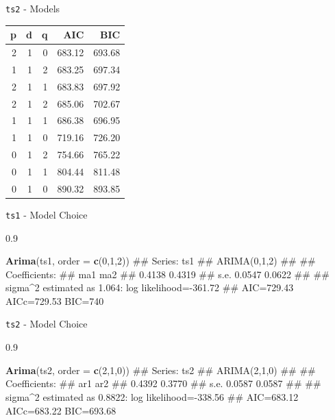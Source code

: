 \documentclass[11pt,ignorenonframetext,]{beamer}
\newenvironment{Shaded}{}{}
\newcommand{\KeywordTok}[1]{\textcolor[rgb]{0.00,0.44,0.13}{\textbf{#1}}}
\newcommand{\DataTypeTok}[1]{\textcolor[rgb]{0.56,0.13,0.00}{#1}}
\newcommand{\DecValTok}[1]{\textcolor[rgb]{0.25,0.63,0.44}{#1}}
\newcommand{\NormalTok}[1]{#1}
\let\oldShaded\Shaded
\let\endoldShaded\endShaded
\renewenvironment{Shaded}{\footnotesize\begin{spacing}{0.9}\oldShaded}{\endoldShaded\end{spacing}}
\begin{document}
\begin{frame}{\texttt{ts2} - Models}

\begin{longtable}[]{@{}rrrrr@{}}
\toprule
p & d & q & AIC & BIC\tabularnewline
\midrule
\endhead
2 & 1 & 0 & 683.12 & 693.68\tabularnewline
1 & 1 & 2 & 683.25 & 697.34\tabularnewline
2 & 1 & 1 & 683.83 & 697.92\tabularnewline
2 & 1 & 2 & 685.06 & 702.67\tabularnewline
1 & 1 & 1 & 686.38 & 696.95\tabularnewline
1 & 1 & 0 & 719.16 & 726.20\tabularnewline
0 & 1 & 2 & 754.66 & 765.22\tabularnewline
0 & 1 & 1 & 804.44 & 811.48\tabularnewline
0 & 1 & 0 & 890.32 & 893.85\tabularnewline
\bottomrule
\end{longtable}

\end{frame}

\begin{frame}[fragile,t]{\texttt{ts1} - Model Choice}

\begin{Shaded}
\begin{Highlighting}[]
\KeywordTok{Arima}\NormalTok{(ts1, }\DataTypeTok{order =} \KeywordTok{c}\NormalTok{(}\DecValTok{0}\NormalTok{,}\DecValTok{1}\NormalTok{,}\DecValTok{2}\NormalTok{))}
\NormalTok{## Series: ts1 }
\NormalTok{## ARIMA(0,1,2)                    }
\NormalTok{## }
\NormalTok{## Coefficients:}
\NormalTok{##          ma1     ma2}
\NormalTok{##       0.4138  0.4319}
\NormalTok{## s.e.  0.0547  0.0622}
\NormalTok{## }
\NormalTok{## sigma^2 estimated as 1.064:  log likelihood=-361.72}
\NormalTok{## AIC=729.43   AICc=729.53   BIC=740}
\end{Highlighting}
\end{Shaded}

\end{frame}

\begin{frame}[fragile,t]{\texttt{ts2} - Model Choice}

\begin{Shaded}
\begin{Highlighting}[]
\KeywordTok{Arima}\NormalTok{(ts2, }\DataTypeTok{order =} \KeywordTok{c}\NormalTok{(}\DecValTok{2}\NormalTok{,}\DecValTok{1}\NormalTok{,}\DecValTok{0}\NormalTok{))}
\NormalTok{## Series: ts2 }
\NormalTok{## ARIMA(2,1,0)                    }
\NormalTok{## }
\NormalTok{## Coefficients:}
\NormalTok{##          ar1     ar2}
\NormalTok{##       0.4392  0.3770}
\NormalTok{## s.e.  0.0587  0.0587}
\NormalTok{## }
\NormalTok{## sigma^2 estimated as 0.8822:  log likelihood=-338.56}
\NormalTok{## AIC=683.12   AICc=683.22   BIC=693.68}
\end{Highlighting}
\end{Shaded}

\end{frame}
\end{document}
